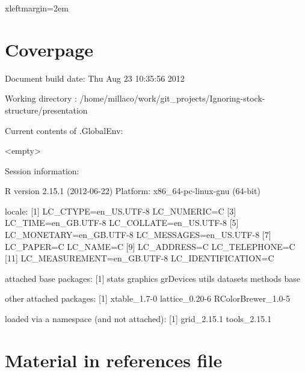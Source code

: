 \documentclass[a4paper,english]{article}
\begin{document}
 {xleftmargin=2em}
\renewenvironment{Schunk}{\vspace{\topsep}}{\vspace{\topsep}}

\section*{Coverpage}



\begin{Schunk}
\begin{Soutput}
Document build date: Thu Aug 23 10:35:56 2012 
\end{Soutput}
\begin{Soutput}
Working directory :
      /home/millaco/work/git_projects/Ignoring-stock-structure/presentation 
\end{Soutput}
\begin{Soutput}
Current contents of .GlobalEnv:
\end{Soutput}
\begin{Soutput}
     <empty>
\end{Soutput}
\begin{Soutput}
Session information:
\end{Soutput}
\begin{Soutput}
R version 2.15.1 (2012-06-22)
Platform: x86_64-pc-linux-gnu (64-bit)

locale:
 [1] LC_CTYPE=en_US.UTF-8       LC_NUMERIC=C              
 [3] LC_TIME=en_GB.UTF-8        LC_COLLATE=en_US.UTF-8    
 [5] LC_MONETARY=en_GB.UTF-8    LC_MESSAGES=en_US.UTF-8   
 [7] LC_PAPER=C                 LC_NAME=C                 
 [9] LC_ADDRESS=C               LC_TELEPHONE=C            
[11] LC_MEASUREMENT=en_GB.UTF-8 LC_IDENTIFICATION=C       

attached base packages:
[1] stats     graphics  grDevices utils     datasets  methods   base     

other attached packages:
[1] xtable_1.7-0       lattice_0.20-6     RColorBrewer_1.0-5

loaded via a namespace (and not attached):
[1] grid_2.15.1  tools_2.15.1
\end{Soutput}
\end{Schunk}

\section*{Material in references file}
\end{document}
